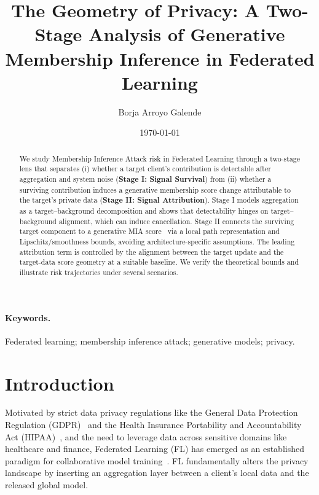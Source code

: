 \documentclass{article}
\title{The Geometry of Privacy: A Two-Stage Analysis of Generative Membership Inference in Federated Learning}
\author{Borja Arroyo Galende}
\date{\today}
\theoremstyle{plain}
\theoremstyle{definition}
\theoremstyle{remark}
\numberwithin{theorem}{section}
\numberwithin{definition}{section}
\numberwithin{remark}{section}
\numberwithin{lemma}{section}
\numberwithin{assumption}{section}
\begin{document}
\maketitle

\begin{abstract}
We study Membership Inference Attack risk in Federated Learning through a two-stage lens that separates
(i) whether a target client's contribution is detectable after aggregation and system noise (\textbf{Stage I: Signal Survival}) from
(ii) whether a surviving contribution induces a generative membership score change attributable to the target's private data (\textbf{Stage II: Signal Attribution}).
Stage I models aggregation as a target--background decomposition and shows that detectability hinges on target--background alignment,
which can induce cancellation. Stage II connects the surviving target component to a generative MIA score~\cite{Galende2025Membership}
via a local path representation and Lipschitz/smoothness bounds, avoiding architecture-specific assumptions.
The leading attribution term is controlled by the alignment between the target update and the target-data score geometry at a suitable baseline.
We verify the theoretical bounds and illustrate risk trajectories under several scenarios.
\end{abstract}

\paragraph{Keywords.}
Federated learning; membership inference attack; generative models; privacy.

\section{Introduction}

Motivated by strict data privacy regulations like the General Data Protection Regulation (GDPR)~\cite{gdpr} and the Health Insurance Portability and Accountability Act (HIPAA)~\cite{hipaa}, and the need to leverage data across sensitive domains like healthcare and finance, Federated Learning (FL) has emerged as an established paradigm for collaborative model training~\cite{mcmahan2017communication,kairouz2021advances}. FL fundamentally alters the privacy landscape by inserting an aggregation layer between a client's local data and the released global model.
\end{document}

